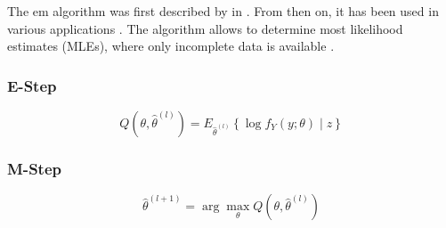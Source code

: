 The \gls{em} algorithm was first described by \citeauthor{Dempster1977} in \citeyear{Dempster1977}. From then on, it has been used in various applications \cite{?}. The algorithm allows to determine most likelihood estimates (MLEs), where only incomplete data is available \cite[p.1]{Dempster1977}.

\subsubsection*{E-Step}
\begin{equation}
	Q(\theta,\hat\theta^{(l)})=E_{\hat\theta^{(l)}}\left\{ \log{f_{Y}(y;\theta)\mid z} \right\}
\end{equation}

\subsubsection*{M-Step}
\begin{equation}
	\hat\theta^{(l+1)}=\arg \max_\theta Q\left ( \theta,\hat\theta^{(l)}\right )
\end{equation}